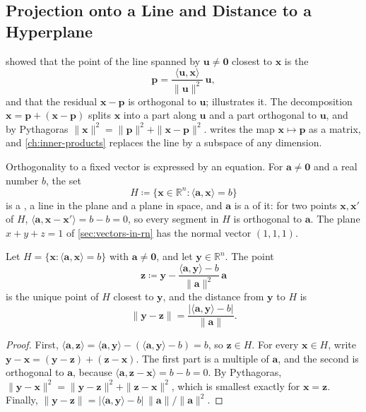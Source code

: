 \subsection{Projection onto a Line and Distance to a Hyperplane}

 showed that the point of the line spanned by $\mathbf u\ne\mathbf 0$ closest to $\mathbf x$ is the 
\[
\mathbf p=\frac{\langle\mathbf u,\mathbf x\rangle}{\|\mathbf u\|^2}\,\mathbf u ,
\]
and that the residual $\mathbf x-\mathbf p$ is orthogonal to $\mathbf u$;  illustrates it. The decomposition $\mathbf x=\mathbf p+(\mathbf x-\mathbf p)$ splits $\mathbf x$ into a part along $\mathbf u$ and a part orthogonal to $\mathbf u$, and by Pythagoras $\|\mathbf x\|^2=\|\mathbf p\|^2+\|\mathbf x-\mathbf p\|^2$.  writes the map $\mathbf x\mapsto\mathbf p$ as a matrix, and \cref{ch:inner-products} replaces the line by a subspace of any dimension.

Orthogonality to a fixed vector is expressed by an equation. For $\mathbf a\ne\mathbf 0$ and a real number $b$, the set
\[
H\coloneqq\{\mathbf x\in\mathbb R^n: \langle\mathbf a,\mathbf x\rangle=b\}
\]
is a , a line in the plane and a plane in space, and $\mathbf a$ is a  of it: for two points $\mathbf x,\mathbf x'$ of $H$, $\langle\mathbf a,\mathbf x-\mathbf x'\rangle=b-b=0$, so every segment in $H$ is orthogonal to $\mathbf a$. The plane $x+y+z=1$ of \cref{sec:vectors-in-rn} has the normal vector $(1,1,1)$.

\begin{proposition}
\label{prop:hyperplane-distance}
Let $H=\{\mathbf x: \langle\mathbf a,\mathbf x\rangle=b\}$ with $\mathbf a\ne\mathbf 0$, and let $\mathbf y\in\mathbb R^n$. The point
\[
\mathbf z\coloneqq\mathbf y-\frac{\langle\mathbf a,\mathbf y\rangle-b}{\|\mathbf a\|^2}\,\mathbf a
\]
is the unique point of $H$ closest to $\mathbf y$, and the distance from $\mathbf y$ to $H$ is
\[
\|\mathbf y-\mathbf z\|=\frac{|\langle\mathbf a,\mathbf y\rangle-b|}{\|\mathbf a\|}.
\]
\end{proposition}

\begin{proof}
First, $\langle\mathbf a,\mathbf z\rangle=\langle\mathbf a,\mathbf y\rangle-(\langle\mathbf a,\mathbf y\rangle-b)=b$, so $\mathbf z\in H$. For every $\mathbf x\in H$, write $\mathbf y-\mathbf x=(\mathbf y-\mathbf z)+(\mathbf z-\mathbf x)$. The first part is a multiple of $\mathbf a$, and the second is orthogonal to $\mathbf a$, because $\langle\mathbf a,\mathbf z-\mathbf x\rangle=b-b=0$. By Pythagoras, $\|\mathbf y-\mathbf x\|^2=\|\mathbf y-\mathbf z\|^2+\|\mathbf z-\mathbf x\|^2$, which is smallest exactly for $\mathbf x=\mathbf z$. Finally, $\|\mathbf y-\mathbf z\|=|\langle\mathbf a,\mathbf y\rangle-b|\,\|\mathbf a\|/\|\mathbf a\|^2$.
\end{proof}

